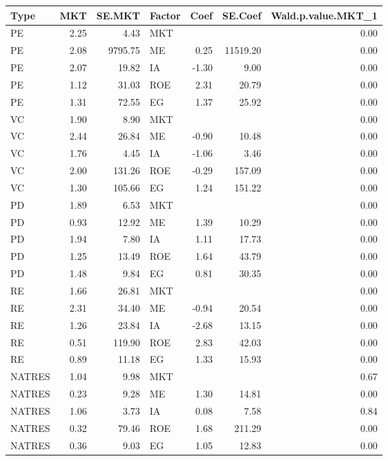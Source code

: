 \documentclass[12pt]{article}
\begin{document}
\begin{table}[ht]
	\centering
	\begin{tabular}{lrrlrrr}
		Type & MKT & SE.MKT & Factor & Coef & SE.Coef & Wald.p.value.MKT\_1 \\ 
		\hline
		\hline
		PE & 2.25 & 4.43 & MKT &  &  & 0.00 \\ 
		PE & 2.08 & 9795.75 & ME & 0.25 & 11519.20 & 0.00 \\ 
		PE & 2.07 & 19.82 & IA & -1.30 & 9.00 & 0.00 \\ 
		PE & 1.12 & 31.03 & ROE & 2.31 & 20.79 & 0.00 \\ 
		PE & 1.31 & 72.55 & EG & 1.37 & 25.92 & 0.00 \\ 
		\hline
		VC & 1.90 & 8.90 & MKT &  &  & 0.00 \\ 
		VC & 2.44 & 26.84 & ME & -0.90 & 10.48 & 0.00 \\ 
		VC & 1.76 & 4.45 & IA & -1.06 & 3.46 & 0.00 \\ 
		VC & 2.00 & 131.26 & ROE & -0.29 & 157.09 & 0.00 \\ 
		VC & 1.30 & 105.66 & EG & 1.24 & 151.22 & 0.00 \\ 
		\hline
		PD & 1.89 & 6.53 & MKT &  &  & 0.00 \\ 
		PD & 0.93 & 12.92 & ME & 1.39 & 10.29 & 0.00 \\ 
		PD & 1.94 & 7.80 & IA & 1.11 & 17.73 & 0.00 \\ 
		PD & 1.25 & 13.49 & ROE & 1.64 & 43.79 & 0.00 \\ 
		PD & 1.48 & 9.84 & EG & 0.81 & 30.35 & 0.00 \\ 
		\hline
		RE & 1.66 & 26.81 & MKT &  &  & 0.00 \\ 
		RE & 2.31 & 34.40 & ME & -0.94 & 20.54 & 0.00 \\ 
		RE & 1.26 & 23.84 & IA & -2.68 & 13.15 & 0.00 \\ 
		RE & 0.51 & 119.90 & ROE & 2.83 & 42.03 & 0.00 \\ 
		RE & 0.89 & 11.18 & EG & 1.33 & 15.93 & 0.00 \\ 
		\hline
		NATRES & 1.04 & 9.98 & MKT &  &  & 0.67 \\ 
		NATRES & 0.23 & 9.28 & ME & 1.30 & 14.81 & 0.00 \\ 
		NATRES & 1.06 & 3.73 & IA & 0.08 & 7.58 & 0.84 \\ 
		NATRES & 0.32 & 79.46 & ROE & 1.68 & 211.29 & 0.00 \\ 
		NATRES & 0.36 & 9.03 & EG & 1.05 & 12.83 & 0.00 \\ 

\end{tabular}
\end{table}
\end{document}
